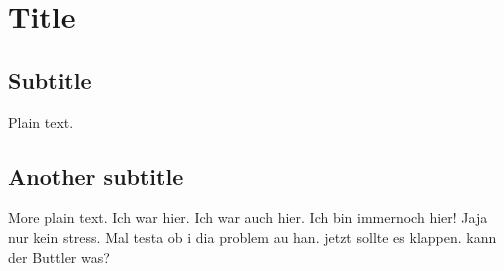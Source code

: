 \documentclass{article}
\begin{document}
\section{Title}

\subsection{Subtitle}

Plain text.

\subsection{Another subtitle}

More plain text.
Ich war hier.
Ich war auch hier.
Ich bin immernoch hier!
Jaja nur kein stress.
Mal testa ob i dia problem au han.
jetzt sollte es klappen.
kann der Buttler was?
\end{document}

